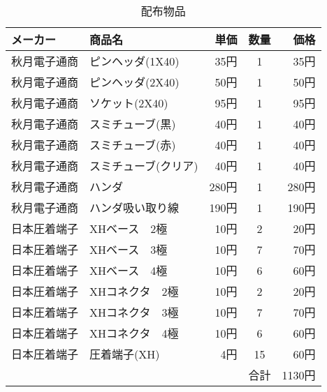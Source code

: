 \begin{table}[H]
 \begin{center}
  \caption{配布物品}
  \label{tab:list1}
  \begin{tabular}{|l|l|r|c|r|}  \hline
   メーカー & 商品名 & 単価 & 数量 & 価格 \\ \hline \hline 
   秋月電子通商 & ピンヘッダ(1X40) & 35円 & 1 & 35円  \\     \hline
   秋月電子通商 & ピンヘッダ(2X40) & 50円 & 1 & 50円  \\     \hline   
   秋月電子通商 & ソケット(2X40) & 95円 & 1 & 95円  \\     \hline
   秋月電子通商 & スミチューブ(黒) & 40円 & 1 & 40円 \\ \hline
   秋月電子通商 & スミチューブ(赤) & 40円 & 1 & 40円 \\ \hline
   秋月電子通商 & スミチューブ(クリア) & 40円 & 1 & 40円 \\ \hline
   秋月電子通商 & ハンダ & 280円 & 1 & 280円 \\ \hline
   秋月電子通商 & ハンダ吸い取り線 & 190円 & 1 & 190円 \\ \hline
   日本圧着端子 & XHベース　2極  & 10円 & 2 & 20円  \\     \hline
   日本圧着端子 & XHベース　3極  & 10円 & 7 & 70円  \\     \hline
   日本圧着端子 & XHベース　4極  & 10円 & 6 & 60円  \\     \hline
   日本圧着端子 & XHコネクタ　2極  & 10円 & 2 & 20円  \\     \hline
   日本圧着端子 & XHコネクタ　3極  & 10円 & 7 & 70円  \\     \hline
   日本圧着端子 & XHコネクタ　4極  & 10円 & 6 & 60円  \\     \hline
   日本圧着端子 & 圧着端子(XH)  & 4円 & 15 & 60円  \\     \hline
   &  & &合計 & 1130円  \\   \hline
  \end{tabular}
 \end{center}
\end{table}

\newpage

